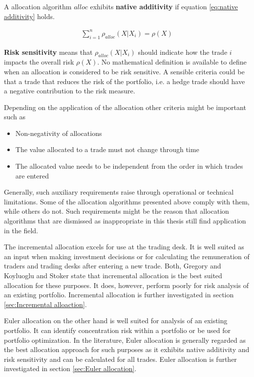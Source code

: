 \documentclass[../Thesis_AHoecherl.tex]{subfiles}
\begin{document}
A allocation algorithm $alloc$ exhibits \textbf{native additivity} if equation \ref{eq:native additivity} holds.

\begin{align}
    \sum_{i=1}^n{\rho_{alloc}\left(X|X_i\right)} = \rho\left(X\right)
    \label{eq:native additivity}
\end{align}

\textbf{Risk sensitivity} means that $\rho_{alloc}\left(X|X_i\right)$ should indicate how the trade $i$ impacts the overall risk $\rho\left(X\right)$. 
No mathematical definition is available to define when an allocation is considered to be risk sensitive. A sensible criteria could be that a trade that reduces the risk of the portfolio, i.e. a hedge trade should have a negative contribution to the risk measure.

Depending on the application of the allocation other criteria might be important such as
\begin{itemize}
    \item Non-negativity of allocations
    \item The value allocated to a trade must not change through time
    \item The allocated value needs to be independent from the order in which trades are entered 
\end{itemize}
Generally, such auxiliary requirements raise through operational or technical limitations. Some of the allocation algorithms presented above comply with them, while others do not. 
Such requirements might be the reason that allocation algorithms that are dismissed as inappropriate in this thesis still find application in the field.

The incremental allocation excels for use at the trading desk. It is well suited as an input when making investment decisions or for calculating the remuneration of traders and trading desks after entering a new trade.
Both, Gregory \cite{gregory2015xva} and Koyluoglu and Stoker \cite{koyluoglu2002risk} state that incremental allocation is the best suited allocation for these purposes. It does, however, perform poorly for risk analysis of an existing portfolio. Incremental allocation is further investigated in section \ref{sec:Incremental alloaction}.

Euler allocation on the other hand is well suited for analysis of an existing portfolio. It can identify concentration risk within a portfolio or be used for portfolio optimization. 
In the literature, Euler allocation is generally regarded as the best allocation approach for such purposes as it exhibits native additivity and risk sensitivity and can be calculated for all trades. Euler allocation is further investigated in section \ref{sec:Euler allocation}.
\end{document}
